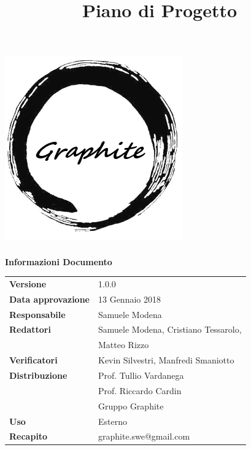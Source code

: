 \documentclass[openany,12pt,a4paper]{report}
\title{Piano di Progetto}
\author{}
\newcommand{\versione}{1.0.0}
\begin{document}
	\makeatletter
	\begin{titlepage}
		\setlength{\headsep}{0pt}  
		\begin{center}
			\includegraphics[width=0.5\linewidth]{logo.png}\\[1em]
			{\huge \bfseries  \@title }\\[10ex]
			\textbf{\Large Informazioni Documento} \\[2em]
			\bgroup
			\def\arraystretch{1.5}
			\begin{tabular}{l|l}
				\textbf{Versione} & \versione{}  \\
				\textbf{Data approvazione} & 13 Gennaio 2018 \\
				\textbf{Responsabile} & Samuele Modena \\
				\textbf{Redattori} & Samuele Modena, Cristiano Tessarolo, \\ 
								   &  Matteo Rizzo \\
				\textbf{Verificatori} & Kevin Silvestri, Manfredi Smaniotto \\
				\textbf{Distribuzione} & Prof. Tullio Vardanega \\
				 & Prof. Riccardo Cardin \\
				 & Gruppo Graphite \\
				\textbf{Uso} & Esterno \\
				\textbf{Recapito} & graphite.swe@gmail.com \\
			\end{tabular}
		\egroup
		\end{center}
	\end{titlepage}
	\makeatother

	\thispagestyle{empty}
	\newpage
	
	
	
	\tableofcontents
	\listoffigures
	\listoftables
	
	
	
	
	
	
	
\end{document}
